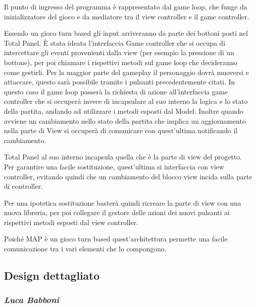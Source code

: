 \documentclass[a4paper,titlepage,12pt]{article}
\begin{document}
\par \noindent Il punto di ingresso del programma è rappresentato dal game loop, che funge da inizializzatore del gioco e da mediatore tra il view controller e il game controller.
\par \noindent Essendo un gioco turn based gli input arriveranno da parte dei bottoni posti nel Total Panel. È stata ideata l’interfaccia Game controller che si occupa di intercettare gli eventi provenienti dalla view (per esempio la pressione di un bottone), per poi chiamare i rispettivi metodi sul game loop che decideranno come gestirli. Per la maggior parte del gameplay il personaggio dovrà muoversi e attaccare, questo sarà possibile tramite i pulsanti precedentemente citati. In questo caso il game loop passerà la richiesta di azione all’interfaccia game controller che si occuperà invece di incapsulare al suo interno la logica e lo stato della partita, andando ad utilizzare i metodi esposti dal Model. Inoltre quando avviene un cambiamento nello stato della partita che implica un aggiornamento nella parte di View si occuperà di comunicare con quest’ultima notificando il cambiamento.
\par \noindent Total Panel al suo interno incapsula quella che è la parte di view del progetto. Per garantire una facile sostituzione, quest’ultima si interfaccia con view controller, evitando quindi che un cambiamento del blocco view incida sulla parte di controller.
\par \noindent Per una ipotetica sostituzione basterà quindi ricreare la parte di view con una nuova libreria, per poi collegare il gestore delle azioni dei nuovi pulsanti ai rispettivi metodi esposti dal view controller.
\par \noindent Poiché MAP è un gioco turn based quest'architettura permette una facile comunicazione tra i vari elementi  che lo compongono. 
\newpage
\subsection{Design dettagliato}

\subsubsection*{\large \slshape Luca Babboni}
\end{document}
